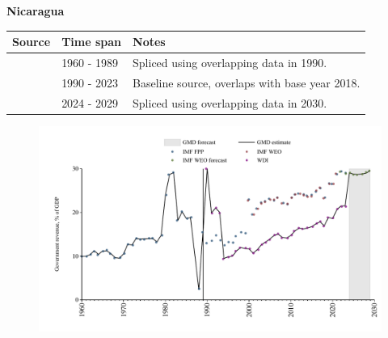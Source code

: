 \documentclass[12pt,a4paper,landscape]{article}
\begin{document}
\begin{adjustbox}{max totalsize={\paperwidth}{\paperheight},center}
\begin{minipage}[t][\textheight][t]{\textwidth}
\vspace*{0.5cm}
{}
\begin{center}
{\Large\bfseries Nicaragua}
\end{center}
\vspace{0.5cm}
\begin{table}[H]
\centering
\small
\begin{tabular}{|l|l|l|}
\hline
\textbf{Source} & \textbf{Time span} & \textbf{Notes} \\
\hline
\rowcolor{white}\cite{IMF_FPP}& 1960 - 1989 &Spliced using overlapping data in 1990.\\
\rowcolor{lightgray}\cite{WDI}& 1990 - 2023 &Baseline source, overlaps with base year 2018.\\
\rowcolor{white}\cite{IMF_WEO_forecast}& 2024 - 2029 &Spliced using overlapping data in 2030.\\
\hline
\end{tabular}
\end{table}
\begin{figure}[H]
\centering
\includegraphics[width=\textwidth,height=0.6\textheight,keepaspectratio]{graphs/NIC_govrev_GDP.pdf}
\end{figure}
\end{minipage}
\end{adjustbox}
\end{document}

